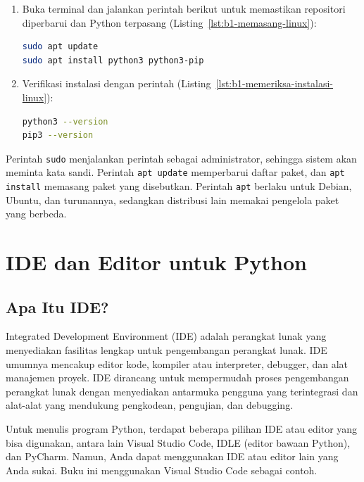 \begin{enumerate}
\item Buka terminal dan jalankan perintah berikut untuk memastikan repositori diperbarui dan Python terpasang (Listing~\ref{lst:b1-memasang-linux}):
\begin{lstlisting}[language=bash, caption={Memasang Python di Linux}, label={lst:b1-memasang-linux}]
sudo apt update
sudo apt install python3 python3-pip
\end{lstlisting}
\item Verifikasi instalasi dengan perintah (Listing~\ref{lst:b1-memeriksa-instalasi-linux}):
\begin{lstlisting}[language=bash, caption={Memeriksa instalasi Python di Linux}, label={lst:b1-memeriksa-instalasi-linux}]
python3 --version
pip3 --version
\end{lstlisting}
\end{enumerate}

Perintah \texttt{sudo} menjalankan perintah sebagai administrator, sehingga sistem akan meminta kata sandi. Perintah \texttt{apt update} memperbarui daftar paket, dan \texttt{apt install} memasang paket yang disebutkan. Perintah \texttt{apt} berlaku untuk Debian, Ubuntu, dan turunannya, sedangkan distribusi lain memakai pengelola paket yang berbeda.

\section{IDE dan Editor untuk Python}

\subsection{Apa Itu IDE?}

Integrated Development Environment (IDE) adalah perangkat lunak yang menyediakan fasilitas lengkap untuk pengembangan perangkat lunak. IDE umumnya mencakup editor kode, kompiler atau interpreter, debugger, dan alat manajemen proyek. IDE dirancang untuk mempermudah proses pengembangan perangkat lunak dengan menyediakan antarmuka pengguna yang terintegrasi dan alat-alat yang mendukung pengkodean, pengujian, dan debugging.

Untuk menulis program Python, terdapat beberapa pilihan IDE atau editor yang bisa digunakan, antara lain Visual Studio Code, IDLE (editor bawaan Python), dan PyCharm. Namun, Anda dapat menggunakan IDE atau editor lain yang Anda sukai. Buku ini menggunakan Visual Studio Code sebagai contoh.

